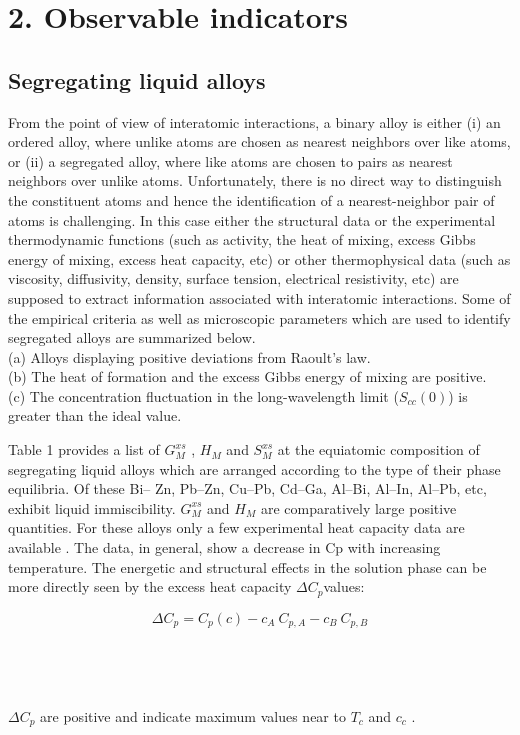 \documentclass[12pt]{article}
\newcommand*{\1}{\hspace{1pt}}
\begin{document}
\section*{2. Observable indicators}


\subsection{Segregating liquid alloys}

    From the point of view of interatomic interactions, a binary alloy is either (i) an ordered
alloy, where unlike atoms are chosen as nearest neighbors over like atoms, or (ii) a
segregated alloy, where like atoms are chosen to pairs as nearest neighbors over unlike
atoms. Unfortunately, there is no direct way to distinguish the constituent atoms and
hence the identification of a nearest-neighbor pair of atoms is challenging. In this case
either the structural data or the experimental thermodynamic functions (such as activity, the heat of
mixing, excess Gibbs energy of mixing, excess heat capacity, etc) or other thermophysical
data (such as viscosity, diffusivity, density, surface tension, electrical resistivity, etc) are
supposed to extract information associated with interatomic interactions. Some of the
empirical criteria as well as microscopic parameters which are used to identify segregated
alloys are summarized below.\\
(a) Alloys displaying positive deviations from Raoult’s law.\\
(b) The heat of formation and the excess Gibbs energy of mixing are positive.\\
(c) The concentration fluctuation in the long-wavelength limit ($ S _{cc}(0) $) is greater than
    the ideal value.


    Table 1 provides a list of $G^{xs} _{M}$ , $H _M$ and $S^{xs} _{M}$ at the equiatomic composition 
of segregating liquid alloys which are arranged according to the type of their phase equilibria. Of these Bi–
Zn, Pb–Zn, Cu–Pb, Cd–Ga, Al–Bi, Al–In, Al–Pb, etc, exhibit liquid immiscibility. $G^{xs} _{M}$ and
$ H _M $ are comparatively large positive quantities. For these alloys only a few experimental
heat capacity data are available . The data, in general, show a decrease in Cp with increasing temperature. The energetic and structural effects in the
solution phase can be more directly seen by the excess heat capacity $\Delta  C _p $values:

    \begin{equation}
        \Delta  C _p = C_p(c) - c_A \ C_{p,A} - c_B \ C_{p,B} 
    \end{equation}
    \\
    \\
    \\
    \\
$\Delta  C _p $ are positive and indicate maximum values near to $ T _c$ and $c _c$ . \\
\end{document}

